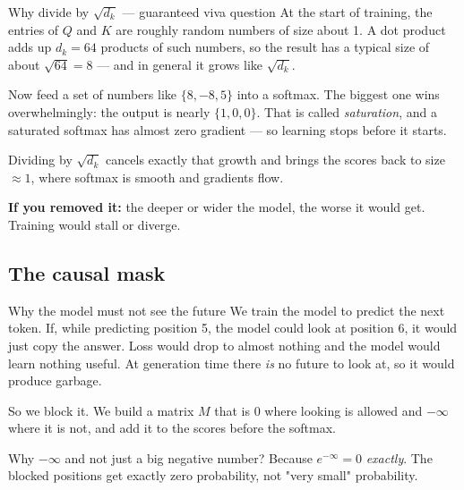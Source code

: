 \documentclass[11pt]{report}
\begin{document}
\begin{concept}{Why divide by $\sqrt{d_k}$ --- guaranteed viva question}
At the start of training, the entries of $Q$ and $K$ are roughly random numbers
of size about 1. A dot product adds up $d_k = 64$ products of such numbers, so
the result has a typical size of about $\sqrt{64} = 8$ --- and in general it
grows like $\sqrt{d_k}$.

Now feed a set of numbers like $\{8, -8, 5\}$ into a softmax. The biggest one
wins overwhelmingly: the output is nearly $\{1, 0, 0\}$. That is called
\emph{saturation}, and a saturated softmax has almost zero gradient --- so
learning stops before it starts.

Dividing by $\sqrt{d_k}$ cancels exactly that growth and brings the scores back
to size $\approx 1$, where softmax is smooth and gradients flow.

\textbf{If you removed it:} the deeper or wider the model, the worse it would get.
Training would stall or diverge.
\end{concept}

\subsection{The causal mask}

\begin{concept}{Why the model must not see the future}
We train the model to predict the next token. If, while predicting position 5,
the model could look at position 6, it would just copy the answer. Loss would
drop to almost nothing and the model would learn nothing useful. At generation
time there \emph{is} no future to look at, so it would produce garbage.

So we block it. We build a matrix $M$ that is $0$ where looking is allowed and
$-\infty$ where it is not, and add it to the scores before the softmax.

Why $-\infty$ and not just a big negative number? Because
$e^{-\infty} = 0$ \emph{exactly}. The blocked positions get exactly zero
probability, not "very small" probability.
\end{concept}
\end{document}
